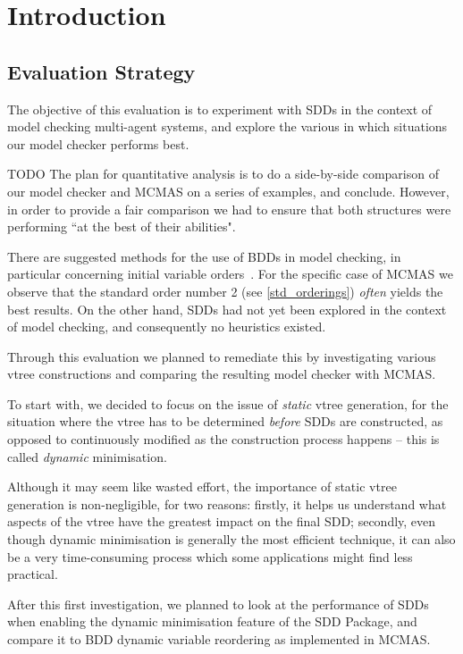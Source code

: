 \documentclass[11pt]{report}
\begin{document}
\section{Introduction}

\subsection{Evaluation Strategy}

The objective of this evaluation is to experiment with SDDs in the context of model checking multi-agent systems, and explore the various in which situations our model checker performs best.

TODO 
 The plan for quantitative analysis is to do a side-by-side comparison of our model checker and MCMAS on a series of examples, and conclude. However, in order to provide a fair comparison we had to ensure that both structures were performing ``at the best of their abilities". 

There are suggested methods for the use of BDDs in model checking, in particular concerning initial variable orders~\cite{bdd_heuristics}. For the specific case of MCMAS we observe that the standard order number 2 (see \ref{std_orderings}) \textit{often} yields the best results.
On the other hand, SDDs had not yet been explored in the context of model checking, and consequently no heuristics existed. 

Through this evaluation we planned to remediate this by investigating various vtree constructions and comparing the resulting model checker with MCMAS. 

To start with, we decided to focus on the issue of \textit{static} vtree generation, for the situation where the vtree has to be determined \textit{before} SDDs are constructed, as opposed to continuously modified as the construction process happens -- this is called \textit{dynamic} minimisation. 

Although it may seem like wasted effort, the importance of static vtree generation is non-negligible, for two reasons: firstly, it helps us understand what aspects of the vtree have the greatest impact on the final SDD; secondly, even though dynamic minimisation is generally the most efficient technique, it can also be a very time-consuming process which some applications might find less practical. 

After this first investigation, we planned to look at the performance of SDDs when enabling the dynamic minimisation feature of the SDD Package, and compare it to BDD dynamic variable reordering as implemented in MCMAS.
\end{document}
